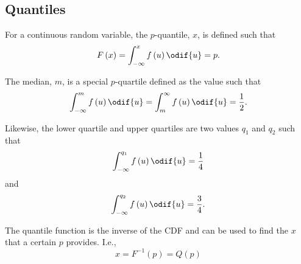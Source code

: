 \documentclass{article}
\begin{document}
\subsection{Quantiles}
\begin{definition}[\(p\)-Quantile]
    For a continuous random variable, the \(p\)-quantile, \(x\), is defined such that
    \begin{equation*}
        F\left( x \right) = \int_{-\infty}^x f\left( u \right) \odif{u} = p.
    \end{equation*}
\end{definition}
\begin{definition}[Median]
    The median, \(m\), is a special \(p\)-quartile defined as the value such that
    \begin{equation*}
        \int_{-\infty}^m f\left( u \right) \odif{u} = \int^{\infty}_m f\left( u \right) \odif{u} = \frac{1}{2}.
    \end{equation*}
\end{definition}
\begin{definition}
    Likewise, the lower quartile and upper quartiles are two values \(q_1\) and \(q_2\) such that
    \begin{equation*}
        \int_{-\infty}^{q_1} f\left( u \right) \odif{u} = \frac{1}{4}
    \end{equation*}
    and
    \begin{equation*}
        \int_{-\infty}^{q_2} f\left( u \right) \odif{u} = \frac{3}{4}.
    \end{equation*}
\end{definition}
\begin{definition}
    The quantile function is the inverse of the CDF
    and can be used to find the \(x\) that a certain \(p\) provides. I.e.,
    \begin{equation*}
        x = F^{-1}\left( p \right) = Q\left( p \right)
    \end{equation*}
\end{definition}
\end{document}
